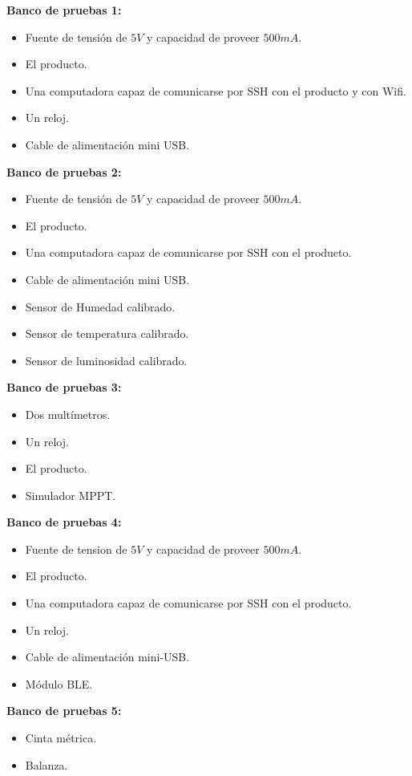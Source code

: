 \textbf{Banco de pruebas 1:}
\begin{itemize}
	\item Fuente de tensión de $5V$ y capacidad de proveer $500 mA$.
	\item El producto.	
	\item Una computadora capaz de comunicarse por SSH con el producto  y con Wifi.
	\item Un reloj.
	\item Cable de alimentación mini USB.
\end{itemize}

\textbf{Banco de pruebas 2:}
\begin{itemize}
	\item Fuente de tensión de $5 V$ y capacidad de proveer $500 mA$.
	\item El producto.	
	\item Una computadora capaz de comunicarse por SSH con el producto.
	\item Cable de alimentación mini USB.
	\item Sensor de Humedad calibrado.
	\item Sensor de temperatura calibrado.
	\item Sensor de luminosidad calibrado.
\end{itemize}

\textbf{Banco de pruebas 3:}
\begin{itemize}
	\item Dos multímetros.
	\item Un reloj.
	\item El producto.
	\item Simulador MPPT.
\end{itemize}

\textbf{Banco de pruebas 4:}
\begin{itemize}
	\item Fuente de tension de $5V$ y capacidad de proveer $500mA$.
	\item El producto.	
	\item Una computadora capaz de comunicarse por SSH con el producto.
	\item Un reloj.
	\item Cable de alimentación mini-USB.
	\item Módulo BLE.
\end{itemize}


\textbf{Banco de pruebas 5:}
\begin{itemize}
	\item Cinta métrica.
	\item Balanza.
\end{itemize}